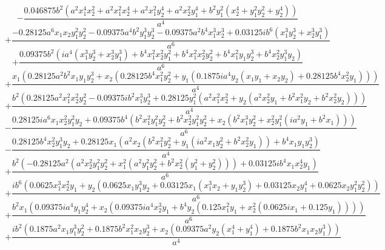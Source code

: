 $$- \frac{0.046875 b^{2} \left(a^{2} x_{1}^{4} x_{2}^{2} + a^{2} x_{1}^{2} x_{2}^{4} + a^{2} x_{1}^{2} y_{2}^{4} + a^{2} x_{2}^{2} y_{1}^{4} + b^{2} y_{1}^{2} \left(x_{2}^{4} + y_{1}^{2} y_{2}^{2} + y_{2}^{4}\right)\right)}{a^{4}}$$
$$+\frac{- 0.28125 a^{6} x_{1} x_{2} y_{1}^{2} y_{2}^{2} - 0.09375 a^{4} b^{2} y_{1}^{3} y_{2}^{3} - 0.09375 a^{2} b^{4} x_{1}^{3} x_{2}^{3} + 0.03125 i b^{6} \left(x_{1}^{3} y_{2}^{3} + x_{2}^{3} y_{1}^{3}\right)}{a^{6}}$$
$$+\frac{0.09375 b^{2} \left(i a^{4} \left(x_{1}^{3} y_{2}^{3} + x_{2}^{3} y_{1}^{3}\right) + b^{4} x_{1}^{2} x_{2}^{2} y_{1}^{2} + b^{4} x_{1}^{2} x_{2}^{2} y_{2}^{2} + b^{4} x_{1}^{2} y_{1} y_{2}^{3} + b^{4} x_{2}^{2} y_{1}^{3} y_{2}\right)}{a^{6}}$$
$$+\frac{x_{1} \left(0.28125 a^{2} b^{2} x_{1} y_{1} y_{2}^{3} + x_{2} \left(0.28125 b^{4} x_{1}^{2} y_{2}^{2} + y_{1} \left(0.1875 i a^{4} y_{2} \left(x_{1} y_{1} + x_{2} y_{2}\right) + 0.28125 b^{4} x_{2}^{2} y_{1}\right)\right)\right)}{a^{4}}$$
$$+\frac{b^{2} \left(0.28125 a^{2} x_{1}^{2} x_{2}^{2} y_{2}^{2} - 0.09375 i b^{2} x_{1}^{3} y_{2}^{3} + 0.28125 y_{1}^{2} \left(a^{2} x_{1}^{2} x_{2}^{2} + y_{2} \left(a^{2} x_{2}^{2} y_{1} + b^{2} x_{1}^{2} y_{2} + b^{2} x_{2}^{2} y_{2}\right)\right)\right)}{a^{4}}$$
$$- \frac{0.28125 i a^{6} x_{1} x_{2}^{2} y_{1}^{2} y_{2} + 0.09375 b^{4} \left(b^{2} x_{1}^{2} y_{1}^{2} y_{2}^{2} + b^{2} x_{2}^{2} y_{1}^{2} y_{2}^{2} + x_{2} \left(b^{2} x_{1}^{3} y_{2}^{2} + x_{2}^{2} y_{1}^{2} \left(i a^{2} y_{1} + b^{2} x_{1}\right)\right)\right)}{a^{6}}$$
$$- \frac{0.28125 b^{4} x_{2}^{2} y_{1}^{3} y_{2} + 0.28125 x_{1} \left(a^{2} x_{2} \left(b^{2} x_{1}^{2} y_{2}^{2} + y_{1} \left(i a^{2} x_{1} y_{2}^{2} + b^{2} x_{2}^{2} y_{1}\right)\right) + b^{4} x_{1} y_{1} y_{2}^{3}\right)}{a^{4}}$$
$$+\frac{b^{2} \left(- 0.28125 a^{2} \left(a^{2} x_{2}^{2} y_{1}^{2} y_{2}^{2} + x_{1}^{2} \left(a^{2} y_{1}^{2} y_{2}^{2} + b^{2} x_{2}^{2} \left(y_{1}^{2} + y_{2}^{2}\right)\right)\right) + 0.03125 i b^{4} x_{1} x_{2}^{4} y_{1}\right)}{a^{6}}$$
$$+\frac{i b^{6} \left(0.0625 x_{1}^{3} x_{2}^{2} y_{1} + y_{2} \left(0.0625 x_{1} y_{1}^{3} y_{2} + 0.03125 x_{1} \left(x_{1}^{3} x_{2} + y_{1} y_{2}^{3}\right) + 0.03125 x_{2} y_{1}^{4} + 0.0625 x_{2} y_{1}^{2} y_{2}^{2}\right)\right)}{a^{6}}$$
$$+\frac{b^{2} x_{1} \left(0.09375 i a^{4} y_{1} y_{2}^{4} + x_{2} \left(0.09375 i a^{4} x_{2}^{3} y_{1} + b^{4} y_{2} \left(0.125 x_{1}^{2} y_{1} + x_{2}^{2} \left(0.0625 i x_{1} + 0.125 y_{1}\right)\right)\right)\right)}{a^{6}}$$
$$+\frac{i b^{2} \left(0.1875 a^{2} x_{1} y_{1}^{3} y_{2}^{2} + 0.1875 b^{2} x_{1}^{2} x_{2} y_{2}^{3} + x_{2} \left(0.09375 a^{2} y_{2} \left(x_{1}^{4} + y_{1}^{4}\right) + 0.1875 b^{2} x_{1} x_{2} y_{1}^{3}\right)\right)}{a^{4}}$$
